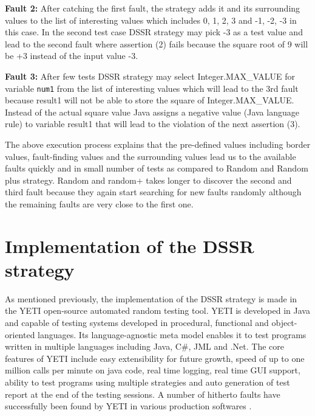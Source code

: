 \documentclass[conference]{IEEEtran}
\begin{document}
\indent \textbf{Fault 2:} After catching the first fault, the strategy adds it and its surrounding values to the list of interesting values which includes 0, 1, 2, 3 and -1, -2, -3 in this case. In the second test case DSSR strategy may pick -3 as a test value and lead to the second fault where assertion (2) fails because the square root of 9 will be +3 instead of the input value -3.

\indent \textbf{Fault 3:} After few tests DSSR strategy may select Integer.MAX\_VALUE for variable \verb+num1+  from the list of interesting values which will lead to the 3rd fault because result1 will not be able to store the square of Integer.MAX\_VALUE. Instead of the actual square value Java assigns a negative value (Java language rule) to variable result1 that will lead to the violation of the next assertion (3).

The above execution process explains that the pre-defined values including border values, fault-finding values and the surrounding values lead us to the available faults quickly and in small number of tests as compared to Random and Random plus strategy. Random and random+ takes longer to discover the second and third fault because they again start searching for new faults randomly although the remaining faults are very close to the first one. 





\section{Implementation of the DSSR strategy}\label{sec:imp}
As mentioned previously, the implementation of the DSSR strategy is made in the YETI open-source automated random testing tool\cite{Oriol2011, Oriol2012}. YETI is developed in Java and capable of testing systems developed in procedural, functional and object-oriented languages. Its language-agnostic meta model enables it to test programs written in multiple languages including Java, C\#, JML and .Net. The core features of YETI include easy extensibility for future growth, speed of up to one million calls per minute on java code, real time logging, real time GUI support, ability to test programs using multiple strategies and auto generation of test report at the end of the testing sessions. A number of hitherto faults have successfully been found by YETI in various production softwares \cite{Oriol2012, Oriol2012}.
\end{document}
